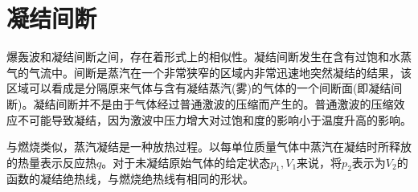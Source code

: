 \documentclass[12pt,a4paper]{article}
\begin{document}
\section{凝结间断}
爆轰波和凝结间断之间，存在着形式上的相似性。凝结间断发生在含有过饱和水蒸气的气流中。间断是蒸汽在一个非常狭窄的区域内非常迅速地突然凝结的结果，该区域可以看成是分隔原来气体与含有凝结蒸汽(雾)的气体的一个间断面(即凝结间断)。凝结间断并不是由于气体经过普通激波的压缩而产生的。普通激波的压缩效应不可能导致凝结，因为激波中压力增大对过饱和度的影响小于温度升高的影响。

与燃烧类似，蒸汽凝结是一种放热过程。以每单位质量气体中蒸汽在凝结时所释放的热量表示反应热$q$。对于未凝结原始气体的给定状态$p_1, V_1$来说，将$p_2$表示为$V_2$的函数的凝结绝热线，与燃烧绝热线有相同的形状。
\end{document}
